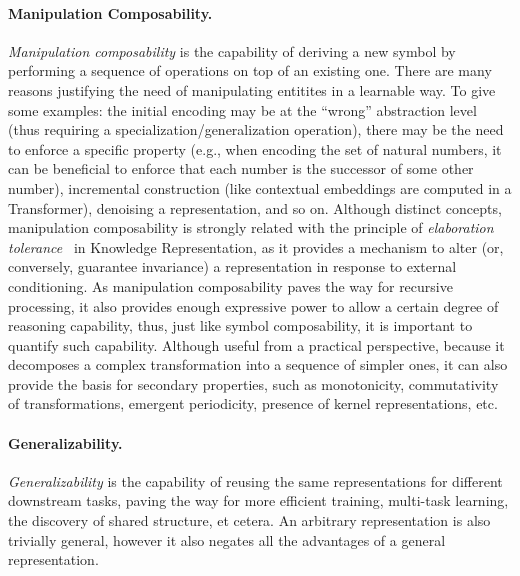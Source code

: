 \paragraph{Manipulation Composability.} \textit{Manipulation composability} is the capability of deriving a new symbol by performing a sequence of operations on top of an existing one. There are many reasons justifying the need of manipulating entitites in a learnable way. To give some examples: 
the initial encoding may be at the ``wrong'' abstraction level (thus requiring a specialization/generalization operation), there may be the need to enforce a specific property (e.g., when encoding the set of natural numbers, it can be beneficial to enforce that each number is the successor of some other number), incremental construction (like contextual embeddings are computed in a Transformer), denoising a representation, and so on.
Although distinct concepts, manipulation composability is strongly related with the principle of \textit{elaboration tolerance}~\cite{mccarthy1998elaboration} in Knowledge Representation, as it provides a mechanism to alter (or, conversely, guarantee invariance) a representation in response to external conditioning. As manipulation composability paves the way for recursive processing, it also provides enough expressive power to allow a certain degree of reasoning capability, thus, just like symbol composability, it is important to quantify such capability.
Although useful from a practical perspective, because it decomposes a complex transformation into a sequence of simpler ones, it can also provide the basis for secondary properties, such as monotonicity, commutativity of transformations, emergent periodicity, presence of kernel representations, etc.

\paragraph{Generalizability.} \textit{Generalizability} is the capability of reusing the same representations for different downstream tasks, paving the way for more efficient training, multi-task learning, the discovery of shared structure, et cetera.
An arbitrary representation is also trivially general, however it also negates all the advantages of a general representation.

